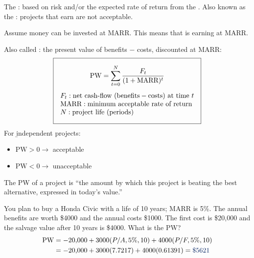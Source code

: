 \begin{definition}[MARR]
    The : based on risk and/or the
    expected rate of return from the . Also known as
    the : projects that earn  are not
    acceptable.
\end{definition}

\begin{remark}
    Assume money can  be invested at MARR. This means that
     is earning at MARR.
\end{remark}

\begin{definition}
    Also called : the present value of
    benefits $-$ costs, discounted at MARR:
    \[\boxed{\begin{gathered}
        \text{PW} = \sum_{t=0}^{N} \frac{F_t}{(1+\text{MARR})^t}\\[4pt]
        \begin{array}{@{}l@{}}
            F_t: \text{net cash-flow (benefits} - \text{costs) at time } t\\
            \text{MARR}: \text{minimum acceptable rate of return}\\
            N: \text{project life (periods)}
        \end{array}
    \end{gathered}}\]
    For \b{independent} projects:
    \begin{itemize}
        \item $\text{PW} > 0 \to$ acceptable
        \item $\text{PW} < 0 \to$ unacceptable
    \end{itemize}
\end{definition}

\begin{remark}
    The PW of a project is ``the amount by which this project is beating
    the best alternative, expressed in today's value.''
\end{remark}

\begin{example}[Calculating PW]
    You plan to buy a Honda Civic with a life of 10 years; MARR is 5\%. The
    annual benefits are worth \$4000 and the annual costs \$1000. The first
    cost is \$20,000 and the salvage value after 10 years is \$4000. What is
    the PW?
    \\
    \begin{align*}
        \text{PW} &= -20{,}000 + 3000(P/A,5\%,10) + 4000(P/F,5\%,10)\\
        &= -20{,}000 + 3000(7.7217) + 4000(0.61391) = \db{\$5621}
    \end{align*}
\end{example}

